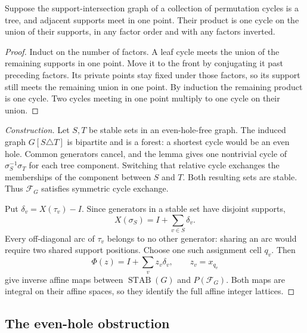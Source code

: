 \begin{lemma}
Suppose the support-intersection graph of a collection of permutation
cycles is a tree, and adjacent supports meet in one point. Their product
is one cycle on the union of their supports, in any factor order and
with any factors inverted.
\end{lemma}

\begin{proof}
Induct on the number of factors. A leaf cycle meets the union of the
remaining supports in one point. Move it to the front by conjugating
it past preceding factors. Its private points stay fixed under those
factors, so its support still meets the remaining union in one point.
By induction the remaining product is one cycle. Two cycles meeting
in one point multiply to one cycle on their union.
\end{proof}

\begin{proof}[Construction]
Let $S,T$ be stable sets in an even-hole-free graph. The induced graph
$G[S\triangle T]$ is bipartite and is a forest: a shortest cycle would
be an even hole. Common generators cancel, and the lemma gives one
nontrivial cycle of $\sigma_S^{-1}\sigma_T$ for each tree component.
Switching that relative cycle exchanges the memberships of the component
between $S$ and $T$. Both resulting sets are stable. Thus
$\mathcal F_G$ satisfies symmetric cycle exchange.

Put $\delta_v=X(\tau_v)-I$. Since generators in a stable set have
disjoint supports,
\[
 X(\sigma_S)=I+\sum_{v\in S}\delta_v.
\]
Every off-diagonal arc of $\tau_v$ belongs to no other generator:
sharing an arc would require two shared support positions. Choose one
such assignment cell $q_v$. Then
\[
 \Phi(z)=I+\sum_v z_v\delta_v,
 \qquad z_v=x_{q_v}
\]
give inverse affine maps between $\operatorname{STAB}(G)$ and
$P(\mathcal F_G)$. Both maps are integral on their affine spaces,
so they identify the full affine integer lattices.
\end{proof}

\subsection[evenHoleObstruction]{The even-hole obstruction}

